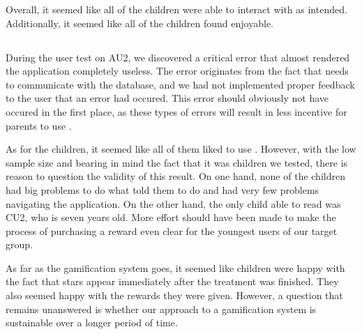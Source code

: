 Overall, it seemed like all of the children were able to interact with \ab{} as intended. Additionally, it seemed like all of the children found \ab{} enjoyable. 

\subsection{\app{}}

During the user test on AU2, we discovered a critical error that almost rendered the application completely useless. The error originates from the fact that \app{} needs to communicate with the database, and we had not implemented proper feedback to the user that an error had occured. This error should obviously not have occured in the first place, as these types of errors will result in less incentive for parents to use \app{}. 

As for the children, it seemed like all of them liked to use \app{}. However, with the low sample size and bearing in mind the fact that it was children we tested, there is reason to question the validity of this result. On one hand, none of the children had big problems to do what \app{} told them to do and had very few problems navigating the application. On the other hand, the only child able to read was CU2, who is seven years old. More effort should have been made to make the process of purchasing a reward even clear for the youngest users of our target group.     

As far as the gamification system goes, it seemed like children were happy with the fact that stars appear immediately after the treatment was finished. They also seemed happy with the rewards they were given. However, a question that remains unanswered is whether our approach to a gamification system is sustainable over a longer period of time. 